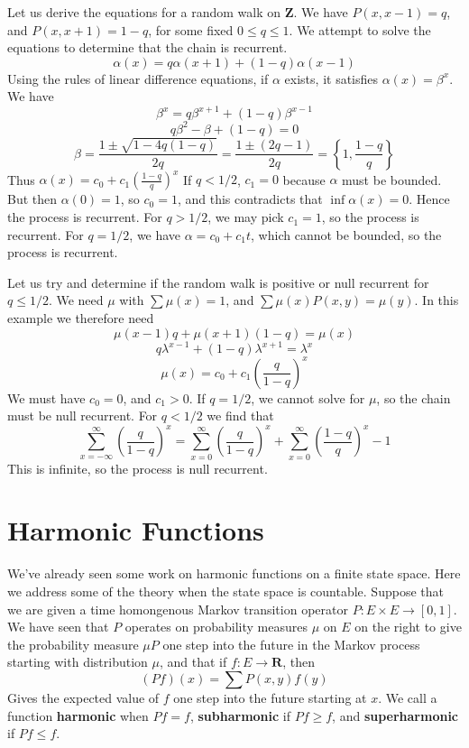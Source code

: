 \begin{example}
    Let us derive the equations for a random walk on $\mathbf{Z}$. We have $P(x,x-1) = q$, and $P(x,x+1) = 1-q$, for some fixed $0 \leq q \leq 1$. We attempt to solve the equations to determine that the chain is recurrent.
    \[ \alpha(x) = q \alpha(x+1) + (1 - q)\alpha(x-1) \]
    Using the rules of linear difference equations, if $\alpha$ exists, it satisfies $\alpha(x) = \beta^x$. We have
    \[ \beta^x = q\beta^{x+1} + (1-q)\beta^{x-1} \]
    \[ q\beta^2 - \beta + (1 - q) = 0 \]
    \[ \beta = \frac{1 \pm \sqrt{1 - 4q(1-q)}}{2q} = \frac{1 \pm (2q - 1)}{2q} = \left\{ 1, \frac{1-q}{q} \right\} \]
    Thus $\alpha(x) = c_0 + c_1 \left( \frac{1-q}{q} \right)^x$
    If $q < 1/2$, $c_1 = 0$ because $\alpha$ must be bounded. But then $\alpha(0) = 1$, so $c_0 = 1$, and this contradicts that $\inf \alpha(x) = 0$. Hence the process is recurrent. For $q > 1/2$, we may pick $c_1 = 1$, so the process is recurrent. For $q = 1/2$, we have $\alpha = c_0 + c_1 t$, which cannot be bounded, so the process is recurrent.

    Let us try and determine if the random walk is positive or null recurrent for $q \leq 1/2$. We need $\mu$ with $\sum \mu(x) = 1$, and $\sum \mu(x) P(x,y) = \mu(y)$. In this example we therefore need
    \[ \mu(x-1) q + \mu(x+1)(1 -q) = \mu(x) \]
    \[ q\lambda^{x-1} + (1 - q)\lambda^{x+1} = \lambda^x \]
    \[ \mu(x) = c_0 + c_1 \left( \frac{q}{1-q} \right)^x \]
    We must have $c_0 = 0$, and $c_1 > 0$. If $q = 1/2$, we cannot solve for $\mu$, so the chain must be null recurrent. For $q < 1/2$ we find that
    \[ \sum_{x = -\infty}^\infty \left( \frac{q}{1-q} \right)^x = \sum_{x = 0}^\infty \left( \frac{q}{1-q} \right)^x + \sum_{x = 0}^\infty \left( \frac{1-q}{q} \right)^x - 1 \]
    This is infinite, so the process is null recurrent.
\end{example}

\chapter{Harmonic Functions}

We've already seen some work on harmonic functions on a finite state space. Here we address some of the theory when the state space is countable. Suppose that we are given a time homongenous Markov transition operator $P: E \times E \to [0,1]$. We have seen that $P$ operates on probability measures $\mu$ on $E$ on the right to give the probability measure $\mu P$ one step into the future in the Markov process starting with distribution $\mu$, and that if $f: E \to \mathbf{R}$, then
%
\[ (Pf)(x) = \sum P(x,y) f(y) \]
%
Gives the expected value of $f$ one step into the future starting at $x$. We call a function {\bf harmonic} when $Pf = f$, {\bf subharmonic} if $Pf \geq f$, and {\bf superharmonic} if $Pf \leq f$.


